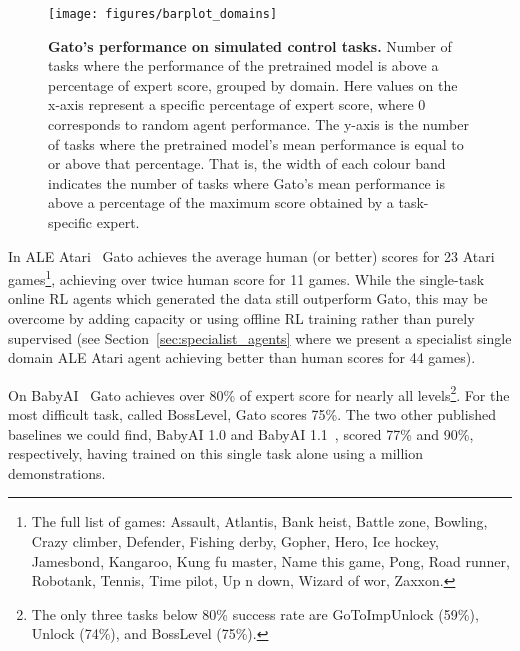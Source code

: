 \documentclass[10pt]{article} \usepackage[accepted]{tmlr}
\newcommand{\model}{{Gato}}
\newcommand{\atari}{{ALE Atari}}
\begin{document}
\begin{figure}[t]
    \centering
    \texttt{[image: figures/barplot\_domains]}
    \caption{
    {\bf \model{}'s performance on simulated control tasks.} Number of tasks where the performance of the pretrained model is above a percentage of expert score, grouped by domain. Here values on the x-axis represent a specific percentage of expert score, where 0 corresponds to random agent performance. The y-axis is the number of tasks where the pretrained model's mean performance is equal to or above that percentage. That is, the width of each colour band indicates the number of tasks where \model{}'s mean performance is above a percentage of the maximum score obtained by a task-specific expert.
    \label{fig:indist_barplot}}
\end{figure}

In \atari{}~\citep{bellemare2013arcade} \model{} achieves the average human (or better) scores for 23 Atari games\footnote{The full list of games: Assault, Atlantis, Bank heist, Battle zone, Bowling, Crazy climber, Defender, Fishing derby, Gopher, Hero, Ice hockey, Jamesbond, Kangaroo, Kung fu master, Name this game, Pong, Road runner, Robotank, Tennis, Time pilot, Up n down, Wizard of wor, Zaxxon.}, achieving over twice human score for 11 games.
While the single-task online RL agents which generated the data still outperform \model{}, this may be overcome by adding capacity or using offline RL training rather than purely supervised (see Section~\ref{sec:specialist_agents} where we present a specialist single domain \atari{} agent achieving better than human scores for 44 games).


On BabyAI~\citep{chevalier2018babyai} \model{} achieves over 80\% of expert score for nearly all levels\footnote{The only three tasks below 80\% success rate are GoToImpUnlock (59\%), Unlock (74\%), and BossLevel (75\%).}.
For the most difficult task, called BossLevel, \model{} scores 75\%.
The two other published baselines we could find, BabyAI 1.0 and BabyAI 1.1~\citep{hui2020babyai}, scored 77\% and 90\%, respectively, having trained on this single task alone using a million demonstrations.
\end{document}
